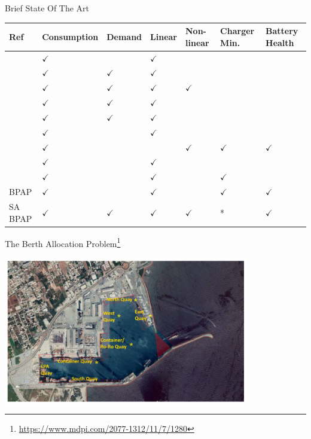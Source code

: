 \documentclass[aspectratio=169,dvipsnames]{beamer}
\begin{document}
\begin{frame}[label={sec:org76a4d1d}]{Brief State Of The Art}
{\scriptsize
\begin{center}
\begin{tabularx}{\textwidth}{XXXXXXX}
\hline
Ref & Consumption & Demand & Linear & Non-linear & Charger Min. & Battery Health\\[0pt]
\hline
\cite{duan-2021-refor-mixed} & \(\checkmark\) &  & \(\checkmark\) &  &  & \\[0pt]
\cite{frendo-2021-open-sourc} & \(\checkmark\) & \(\checkmark\) & \(\checkmark\) &  &  & \\[0pt]
\cite{jahic-2019-preem} & \(\checkmark\) & \(\checkmark\) & \(\checkmark\) & \(\checkmark\) &  & \\[0pt]
\cite{mortensen-2023-cost-minim} & \(\checkmark\) & \(\checkmark\) & \(\checkmark\) &  &  & \\[0pt]
\cite{qin-2016-numer-analy} & \(\checkmark\) & \(\checkmark\) & \(\checkmark\) &  &  & \\[0pt]
\cite{rinaldi-2020-mixed-fleet} & \(\checkmark\) &  & \(\checkmark\) &  &  & \\[0pt]
\cite{whitaker-2023-a-network} & \(\checkmark\) &  &  & \(\checkmark\) & \(\checkmark\) & \(\checkmark\)\\[0pt]
\cite{zhou-2020-collab-optim} & \(\checkmark\) &  & \(\checkmark\) &  &  & \\[0pt]
\cite{zhou-2020-bi-objec} & \(\checkmark\) &  & \(\checkmark\) &  & \(\checkmark\) & \\[0pt]
BPAP & \(\checkmark\) &  & \(\checkmark\) &  & \(\checkmark\) & \(\checkmark\)\\[0pt]
SA BPAP & \(\checkmark\) & \(\checkmark\) & \(\checkmark\) & \(\checkmark\) & * & \(\checkmark\)\\[0pt]
\hline
\end{tabularx}
\end{center}
}
\end{frame}

\begin{frame}[label={sec:org686159d}]{The Berth Allocation Problem\footnote{\url{https://www.mdpi.com/2077-1312/11/7/1280}}}
\begin{center}
\includegraphics[width=0.8\textwidth]{./img/berthing-sky-picture.png}
\end{center}
\end{frame}
\end{document}
